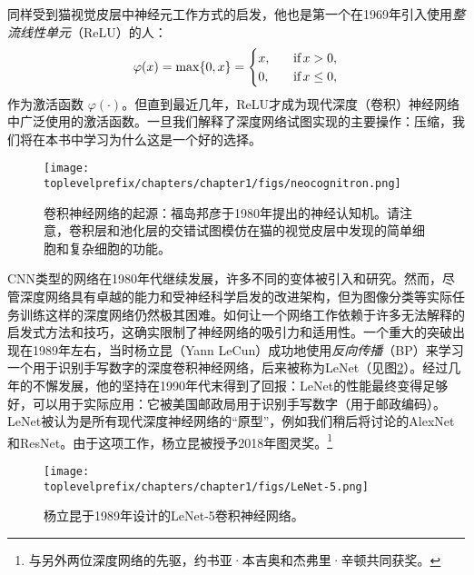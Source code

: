 \documentclass[../../book-main_zh.tex]{subfiles}
\begin{document}
同样受到猫视觉皮层中神经元工作方式的启发，他也是第一个在1969年引入使用{\em 整流线性单元}（ReLU）的人\cite{Fukushima-1969}：
\begin{equation}
    \varphi(x) = \max\{0, x\} = \begin{cases}x, & \text{if} \, x > 0, \\ 0, \quad & \text{if} \, x \leq 0,\end{cases}
\end{equation}
作为激活函数 $\varphi(\cdot)$。但直到最近几年，ReLU才成为现代深度（卷积）神经网络中广泛使用的激活函数。一旦我们解释了深度网络试图实现的主要操作：压缩，我们将在本书中学习为什么这是一个好的选择。

\begin{figure}
    \centering
    \texttt{[image: \\toplevelprefix/chapters/chapter1/figs/neocognitron.png]}
    \caption{卷积神经网络的起源：福岛邦彦于1980年提出的神经认知机。请注意，卷积层和池化层的交错试图模仿在猫的视觉皮层中发现的简单细胞和复杂细胞的功能。}
    \label{fig:neocognitron}
\end{figure}

CNN类型的网络在1980年代继续发展，许多不同的变体被引入和研究。然而，尽管深度网络具有卓越的能力和受神经科学启发的改进架构，但为图像分类等实际任务训练这样的深度网络仍然极其困难。如何让一个网络工作依赖于许多无法解释的启发式方法和技巧，这确实限制了神经网络的吸引力和适用性。一个重大的突破出现在1989年左右，当时杨立昆（Yann LeCun）成功地使用{\em 反向传播}（BP）来学习一个用于识别手写数字的深度卷积神经网络\cite{LeCun-1989}，后来被称为LeNet（见图\ref{fig:LeNet-5}）。经过几年的不懈发展，他的坚持在1990年代末得到了回报：LeNet的性能最终变得足够好，可以用于实际应用\cite{LeCun-1998}：它被美国邮政局用于识别手写数字（用于邮政编码）。LeNet被认为是所有现代深度神经网络的“原型”，例如我们稍后将讨论的AlexNet和ResNet。由于这项工作，杨立昆被授予2018年图灵奖。\footnote{与另外两位深度网络的先驱，约书亚·本吉奥和杰弗里·辛顿共同获奖。}

\begin{figure}
    \centering
\texttt{[image: \\toplevelprefix/chapters/chapter1/figs/LeNet-5.png]}
    \caption{杨立昆于1989年设计的LeNet-5卷积神经网络。}
    \label{fig:LeNet-5}
\end{figure}
\end{document}
